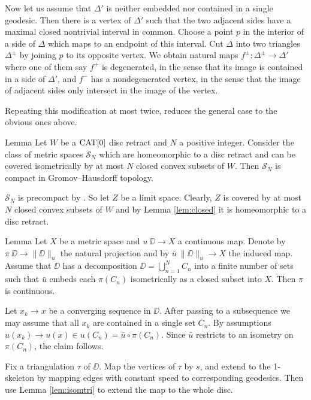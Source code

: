 \documentclass{article}
\begin{document}
Now let us assume that $\Delta'$ is neither embedded nor contained
in a single geodesic. 
Then there is a vertex of $\Delta'$ such that the two adjacent sides have a maximal closed nontrivial interval in common. 
Choose a point $p$ in the interior
of a side of $\Delta$ which maps to an endpoint of this interval. 
Cut $\Delta$ into two triangles $\Delta^\pm$ by joining $p$ to its opposite vertex.
We obtain natural maps $f^\pm:\Delta^\pm\to\Delta'$ where one of them say $f^+$ is degenerated, in the sense that its image is contained in a side of $\Delta'$, and $f^-$ has 
a nondegenerated vertex, in the sense that the image of adjacent sides only intersect in the image of the vertex. 

Repeating this modification at most twice,
reduces the general case to the  obvious ones above.
\qeds

\begin{thm}{Lemma}\label{lem:puzzle-compact}
Let $W$ be a $\mathop{\rm CAT}\nolimits[0]$ disc retract 
and $N$ a positive integer. 
Consider the class of metric spaces $\mathcal{S}_N$ 
which are homeomorphic to a disc retract
and can be covered isometrically by at most $N$ closed convex subsets of $W$.
Then $\mathcal{S}_N$ is compact in Gromov--Hausdorff topology.
\end{thm}

$\mathcal{S}_N$ is precompact by \cite[7.4.15]{BBI}.
So let $Z$ be a limit space.
Clearly, $Z$
is covered by at most $N$ closed convex subsets of 
$W$ and by Lemma \ref{lem:closed} it is homeomorphic to a disc retract.
\qeds

\begin{thm}{Lemma}\label{lem:proj-continuous}
Let $X$ be a metric space and $u\:\DD\to X$ a continuous map.
Denote by $\pi\:\DD\to \|\DD\|_u$ the natural projection and
by $\bar u\:\|\DD\|_u\to X$ the induced map.
Assume that $\DD$ has a decomposition $\DD=\bigcup_{n=1}^N C_n$ into a finite 
number of sets such that $\bar u$ embeds each $\pi(C_n)$ isometrically as a closed subset into $X$.
Then $\pi$
is continuous.
\end{thm}

Let $x_k\to x$ be a converging sequence in $\DD$. 
After passing to a subsequence we may assume that all $x_k$ are contained in a single set $C_n$. 
By assumptions $u(x_k)\to u(x)\in u(C_n)=\bar u\circ \pi (C_n)$. 
Since $\bar u$ restricts to an isometry on $\pi(C_n)$, the claim follows.
\qeds

Fix a triangulation $\tau$ of $\DD$.
Map the vertices of $\tau$ by $s$,
and extend to the 1-skeleton by mapping edges with constant speed to 
corresponding geodesics.
Then use Lemma \ref{lem:isomtri} to extend the map to the whole disc.
\end{document}
